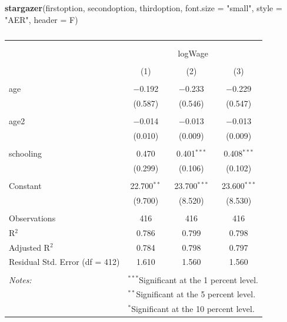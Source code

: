 \documentclass[
]{article}
\newenvironment{Shaded}{\begin{snugshade}}{\end{snugshade}}
\newcommand{\DataTypeTok}[1]{\textcolor[rgb]{0.13,0.29,0.53}{#1}}
\newcommand{\KeywordTok}[1]{\textcolor[rgb]{0.13,0.29,0.53}{\textbf{#1}}}
\newcommand{\NormalTok}[1]{#1}
\newcommand{\StringTok}[1]{\textcolor[rgb]{0.31,0.60,0.02}{#1}}
\begin{document}
\begin{Shaded}
\begin{Highlighting}[]
\KeywordTok{stargazer}\NormalTok{(firstoption, secondoption, thirdoption, }\DataTypeTok{font.size =} \StringTok{"small"}\NormalTok{, }
          \DataTypeTok{style =} \StringTok{"AER"}\NormalTok{, }
          \DataTypeTok{header =}\NormalTok{ F)}
\end{Highlighting}
\end{Shaded}

\begin{table}[!htbp] \centering 
  \caption{} 
  \label{} 
\small 
\begin{tabular}{@{\extracolsep{5pt}}lccc} 
\\[-1.8ex]\hline 
\hline \\[-1.8ex] 
\\[-1.8ex] & \multicolumn{3}{c}{logWage} \\ 
\\[-1.8ex] & (1) & (2) & (3)\\ 
\hline \\[-1.8ex] 
 age & $-$0.192 & $-$0.233 & $-$0.229 \\ 
  & (0.587) & (0.546) & (0.547) \\ 
  & & & \\ 
 age2 & $-$0.014 & $-$0.013 & $-$0.013 \\ 
  & (0.010) & (0.009) & (0.009) \\ 
  & & & \\ 
 schooling & 0.470 & 0.401$^{***}$ & 0.408$^{***}$ \\ 
  & (0.299) & (0.106) & (0.102) \\ 
  & & & \\ 
 Constant & 22.700$^{**}$ & 23.700$^{***}$ & 23.600$^{***}$ \\ 
  & (9.700) & (8.520) & (8.530) \\ 
  & & & \\ 
Observations & 416 & 416 & 416 \\ 
R$^{2}$ & 0.786 & 0.799 & 0.798 \\ 
Adjusted R$^{2}$ & 0.784 & 0.798 & 0.797 \\ 
Residual Std. Error (df = 412) & 1.610 & 1.560 & 1.560 \\ 
\hline \\[-1.8ex] 
\textit{Notes:} & \multicolumn{3}{l}{$^{***}$Significant at the 1 percent level.} \\ 
 & \multicolumn{3}{l}{$^{**}$Significant at the 5 percent level.} \\ 
 & \multicolumn{3}{l}{$^{*}$Significant at the 10 percent level.} \\ 
\end{tabular} 
\end{table}
\end{document}
